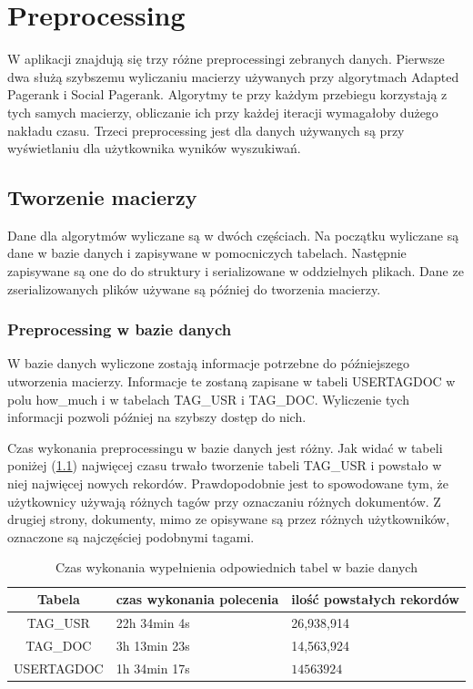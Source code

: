 \documentclass[11pt,a4paper]{report}
\begin{document}
\tableofcontents

\chapter{Preprocessing}

W aplikacji znajdują się trzy różne preprocessingi zebranych danych. Pierwsze dwa służą szybszemu wyliczaniu macierzy używanych przy algorytmach Adapted Pagerank i Social Pagerank. Algorytmy te przy każdym przebiegu korzystają z tych samych macierzy, obliczanie ich przy każdej iteracji wymagałoby dużego nakładu czasu. Trzeci preprocessing jest dla danych używanych są przy wyświetlaniu dla użytkownika wyników wyszukiwań.

\section{Tworzenie macierzy}

Dane dla algorytmów wyliczane są w dwóch częściach. Na początku wyliczane są dane w bazie danych i zapisywane w pomocniczych tabelach. Następnie zapisywane są one do do struktury i serializowane w oddzielnych plikach. Dane ze zserializowanych plików używane są później do tworzenia macierzy.

\subsection{Preprocessing w bazie danych}

W bazie danych wyliczone zostają informacje potrzebne do późniejszego utworzenia macierzy. Informacje te zostaną zapisane w tabeli USERTAGDOC w polu how\_much i w tabelach TAG\_USR i TAG\_DOC. Wyliczenie tych informacji pozwoli później na szybszy dostęp do nich.

Czas wykonania preprocessingu w bazie danych jest różny. Jak widać w tabeli poniżej (\ref{tab:czas_tabele}) najwięcej czasu trwało tworzenie tabeli TAG\_USR i powstało w niej najwięcej nowych rekordów. Prawdopodobnie jest to spowodowane tym, że użytkownicy używają różnych tagów przy oznaczaniu różnych dokumentów. Z drugiej strony, dokumenty, mimo ze opisywane są przez różnych użytkowników, oznaczone są najczęściej podobnymi tagami.

\begin{center}
\begin{table}
  
    \begin{tabular}{ | c | p{3cm}| p{3cm} | }
    \hline
    Tabela & czas wykonania polecenia & ilość powstałych rekordów  \\ 
    \hline
    TAG\_USR & 22h 34min 4s & 26,938,914   \\ 
    \hline
    TAG\_DOC & 3h 13min 23s  &  14,563,924\\ 
    \hline
    USERTAGDOC & 1h 34min 17s  & $14563924$  \\ 
    \hline
    \end{tabular}
     \caption{Czas wykonania wypełnienia odpowiednich tabel w bazie danych}
    \label{tab:czas_tabele}
   
\end{table}
\end{center}
\end{document}
